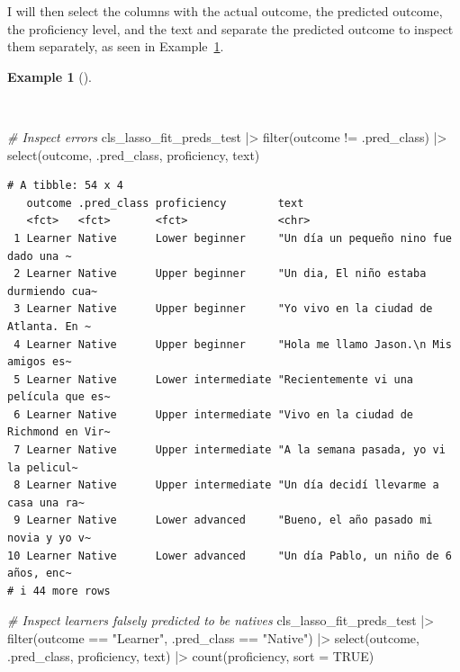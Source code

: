 \documentclass[
  letterpaper,
]{latex/krantz}
\newenvironment{Shaded}{\begin{snugshade}}{\end{snugshade}}
\newcommand{\AttributeTok}[1]{\textcolor[rgb]{0.00,0.00,0.00}{#1}}
\newcommand{\CommentTok}[1]{\textcolor[rgb]{0.00,0.00,0.00}{\textit{#1}}}
\newcommand{\ConstantTok}[1]{\textcolor[rgb]{0.00,0.00,0.00}{#1}}
\newcommand{\FunctionTok}[1]{\textcolor[rgb]{0.00,0.00,0.00}{#1}}
\newcommand{\NormalTok}[1]{\textcolor[rgb]{0.00,0.00,0.00}{#1}}
\newcommand{\SpecialCharTok}[1]{\textcolor[rgb]{0.00,0.00,0.00}{#1}}
\newcommand{\StringTok}[1]{\textcolor[rgb]{0.00,0.00,0.00}{#1}}
\theoremstyle{definition}
\newtheorem{example}{Example}[chapter]
\theoremstyle{remark}
\begin{document}
I will then select the columns with the actual outcome, the predicted
outcome, the proficiency level, and the text and separate the predicted
outcome to inspect them separately, as seen in
Example~\ref{exm-predict-class-tune-hyperparameters-evaluate-test-errors}.

\begin{example}[]\protect\hypertarget{exm-predict-class-tune-hyperparameters-evaluate-test-errors}{}\label{exm-predict-class-tune-hyperparameters-evaluate-test-errors}

~

\begin{Shaded}
\begin{Highlighting}[]
\CommentTok{\# Inspect errors}
\NormalTok{cls\_lasso\_fit\_preds\_test }\SpecialCharTok{|\textgreater{}}
  \FunctionTok{filter}\NormalTok{(outcome }\SpecialCharTok{!=}\NormalTok{ .pred\_class) }\SpecialCharTok{|\textgreater{}}
  \FunctionTok{select}\NormalTok{(outcome, .pred\_class, proficiency, text)}
\end{Highlighting}
\end{Shaded}

\begin{verbatim}
# A tibble: 54 x 4
   outcome .pred_class proficiency        text                                  
   <fct>   <fct>       <fct>              <chr>                                 
 1 Learner Native      Lower beginner     "Un día un pequeño nino fue dado una ~
 2 Learner Native      Upper beginner     "Un dia, El niño estaba durmiendo cua~
 3 Learner Native      Upper beginner     "Yo vivo en la ciudad de Atlanta. En ~
 4 Learner Native      Upper beginner     "Hola me llamo Jason.\n Mis amigos es~
 5 Learner Native      Lower intermediate "Recientemente vi una película que es~
 6 Learner Native      Upper intermediate "Vivo en la ciudad de Richmond en Vir~
 7 Learner Native      Upper intermediate "A la semana pasada, yo vi la pelicul~
 8 Learner Native      Upper intermediate "Un día decidí llevarme a casa una ra~
 9 Learner Native      Lower advanced     "Bueno, el año pasado mi novia y yo v~
10 Learner Native      Lower advanced     "Un día Pablo, un niño de 6 años, enc~
# i 44 more rows
\end{verbatim}

\begin{Shaded}
\begin{Highlighting}[]
\CommentTok{\# Inspect learners falsely predicted to be natives}
\NormalTok{cls\_lasso\_fit\_preds\_test }\SpecialCharTok{|\textgreater{}}
  \FunctionTok{filter}\NormalTok{(outcome }\SpecialCharTok{==} \StringTok{"Learner"}\NormalTok{, .pred\_class }\SpecialCharTok{==} \StringTok{"Native"}\NormalTok{) }\SpecialCharTok{|\textgreater{}}
  \FunctionTok{select}\NormalTok{(outcome, .pred\_class, proficiency, text) }\SpecialCharTok{|\textgreater{}}
  \FunctionTok{count}\NormalTok{(proficiency, }\AttributeTok{sort =} \ConstantTok{TRUE}\NormalTok{)}
\end{Highlighting}
\end{Shaded}


\end{example}
\end{document}
